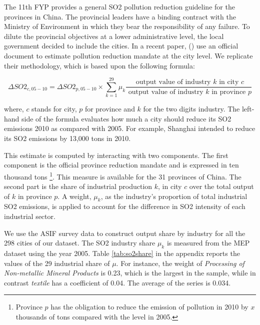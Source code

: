 \documentclass[12pt]{article}
\begin{document}
The 11th FYP provides a general SO2 pollution reduction guideline for the provinces in China. The provincial leaders have a binding contract with the Ministry of Environment in which they bear the responsibility of any failure. To dilute the provincial objectives at a lower administrative level, the local government decided to include the cities. In a recent paper, (\cite{Chen2018-ki}) use an official document to estimate pollution reduction mandate at the city level. We replicate their methodology, which is based upon the following formula:

\begin{equation}
\Delta SO2_{c, 05 - 10}=\Delta SO2_{p, 05 - 10} \times \sum_{k=1}^{29} \mu_{k} \frac{\text { output value of industry } k \text { in city } c}{\text { output value of industry } k \text { in province } p}
\end{equation}

where, $c$ stands for city, $p$ for province and $k$ for the two digits industry. The left-hand side of the formula evaluates how much a city should reduce its SO2 emissions 2010 as compared with 2005. For example, Shanghai intended to reduce its SO2 emissions by 13,000 tons in 2010.

This estimate is computed by interacting with two components. The first component is the official province reduction mandate and is expressed in ten thousand tons \footnote{Province $p$ has the obligation to reduce the emission of pollution in 2010 by $x$ thousands of tons compared with the level in 2005.}. This measure is available for the 31 provinces of China. The second part is the share of industrial production $k$, in city $c$ over the total output of $k$ in province $p$. A weight, $\mu_k$, as the industry's proportion of total industrial SO2 emissions, is applied to account for the difference in SO2 intensity of each industrial sector.

We use the ASIF survey data to construct output share by industry for all the 298 cities of our dataset. The SO2 industry share $\mu_k$  is measured from the MEP dataset using the year 2005. Table \ref{tab:so2share} in the appendix reports the values of the 29 industrial share of $\mu$. For instance, the weight of \textit{Processing of Non-metallic Mineral Products} is 0.23, which is the largest in the sample, while in contrast \textit{textile} has a coefficient of  0.04. The average of the series is 0.034.
\end{document}
